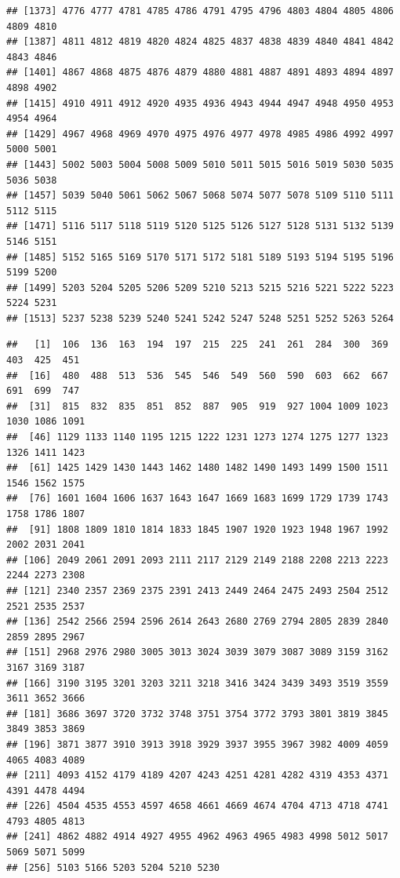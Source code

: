 \documentclass[]{article}
\newenvironment{Shaded}{\begin{snugshade}}{\end{snugshade}}
\newcommand{\DecValTok}[1]{\textcolor[rgb]{0.00,0.00,0.81}{#1}}
\newcommand{\KeywordTok}[1]{\textcolor[rgb]{0.13,0.29,0.53}{\textbf{#1}}}
\newcommand{\NormalTok}[1]{#1}
\newcommand{\OperatorTok}[1]{\textcolor[rgb]{0.81,0.36,0.00}{\textbf{#1}}}
\begin{document}
\begin{verbatim}
## [1373] 4776 4777 4781 4785 4786 4791 4795 4796 4803 4804 4805 4806 4809 4810
## [1387] 4811 4812 4819 4820 4824 4825 4837 4838 4839 4840 4841 4842 4843 4846
## [1401] 4867 4868 4875 4876 4879 4880 4881 4887 4891 4893 4894 4897 4898 4902
## [1415] 4910 4911 4912 4920 4935 4936 4943 4944 4947 4948 4950 4953 4954 4964
## [1429] 4967 4968 4969 4970 4975 4976 4977 4978 4985 4986 4992 4997 5000 5001
## [1443] 5002 5003 5004 5008 5009 5010 5011 5015 5016 5019 5030 5035 5036 5038
## [1457] 5039 5040 5061 5062 5067 5068 5074 5077 5078 5109 5110 5111 5112 5115
## [1471] 5116 5117 5118 5119 5120 5125 5126 5127 5128 5131 5132 5139 5146 5151
## [1485] 5152 5165 5169 5170 5171 5172 5181 5189 5193 5194 5195 5196 5199 5200
## [1499] 5203 5204 5205 5206 5209 5210 5213 5215 5216 5221 5222 5223 5224 5231
## [1513] 5237 5238 5239 5240 5241 5242 5247 5248 5251 5252 5263 5264
\end{verbatim}

\begin{Shaded}
\end{Shaded}

\begin{verbatim}
##   [1]  106  136  163  194  197  215  225  241  261  284  300  369  403  425  451
##  [16]  480  488  513  536  545  546  549  560  590  603  662  667  691  699  747
##  [31]  815  832  835  851  852  887  905  919  927 1004 1009 1023 1030 1086 1091
##  [46] 1129 1133 1140 1195 1215 1222 1231 1273 1274 1275 1277 1323 1326 1411 1423
##  [61] 1425 1429 1430 1443 1462 1480 1482 1490 1493 1499 1500 1511 1546 1562 1575
##  [76] 1601 1604 1606 1637 1643 1647 1669 1683 1699 1729 1739 1743 1758 1786 1807
##  [91] 1808 1809 1810 1814 1833 1845 1907 1920 1923 1948 1967 1992 2002 2031 2041
## [106] 2049 2061 2091 2093 2111 2117 2129 2149 2188 2208 2213 2223 2244 2273 2308
## [121] 2340 2357 2369 2375 2391 2413 2449 2464 2475 2493 2504 2512 2521 2535 2537
## [136] 2542 2566 2594 2596 2614 2643 2680 2769 2794 2805 2839 2840 2859 2895 2967
## [151] 2968 2976 2980 3005 3013 3024 3039 3079 3087 3089 3159 3162 3167 3169 3187
## [166] 3190 3195 3201 3203 3211 3218 3416 3424 3439 3493 3519 3559 3611 3652 3666
## [181] 3686 3697 3720 3732 3748 3751 3754 3772 3793 3801 3819 3845 3849 3853 3869
## [196] 3871 3877 3910 3913 3918 3929 3937 3955 3967 3982 4009 4059 4065 4083 4089
## [211] 4093 4152 4179 4189 4207 4243 4251 4281 4282 4319 4353 4371 4391 4478 4494
## [226] 4504 4535 4553 4597 4658 4661 4669 4674 4704 4713 4718 4741 4793 4805 4813
## [241] 4862 4882 4914 4927 4955 4962 4963 4965 4983 4998 5012 5017 5069 5071 5099
## [256] 5103 5166 5203 5204 5210 5230
\end{verbatim}
\end{document}
